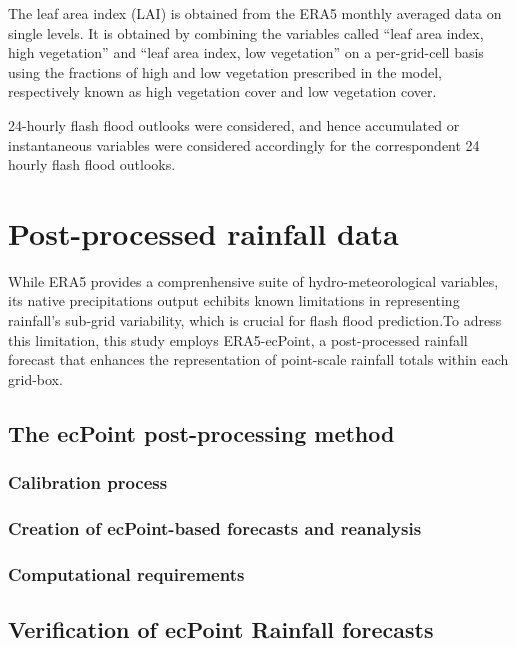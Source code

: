 The leaf area index (LAI) is obtained from the ERA5 monthly averaged data on single levels. It is obtained by combining the variables called “leaf area index, high vegetation” and “leaf area index, low vegetation” on a per-grid-cell basis using the fractions of high and low vegetation prescribed in the model, respectively known as high vegetation cover and low vegetation cover.




24-hourly flash flood outlooks were considered, and hence accumulated or instantaneous variables were considered accordingly for the correspondent 24 hourly flash flood outlooks.





\section{Post-processed rainfall data}

While ERA5 provides a comprenhensive suite of hydro-meteorological variables, its native precipitations output echibits known limitations in representing rainfall's sub-grid variability, which is crucial for flash flood prediction.To adress this limitation, this study employs ERA5-ecPoint, a post-processed rainfall forecast that enhances the representation of point-scale rainfall totals within each grid-box.  

\subsection{The ecPoint post-processing method}

\subsubsection{Calibration process}

\subsubsection{Creation of ecPoint-based forecasts and reanalysis}

\subsubsection{Computational requirements}


\subsection{Verification of ecPoint Rainfall forecasts}


